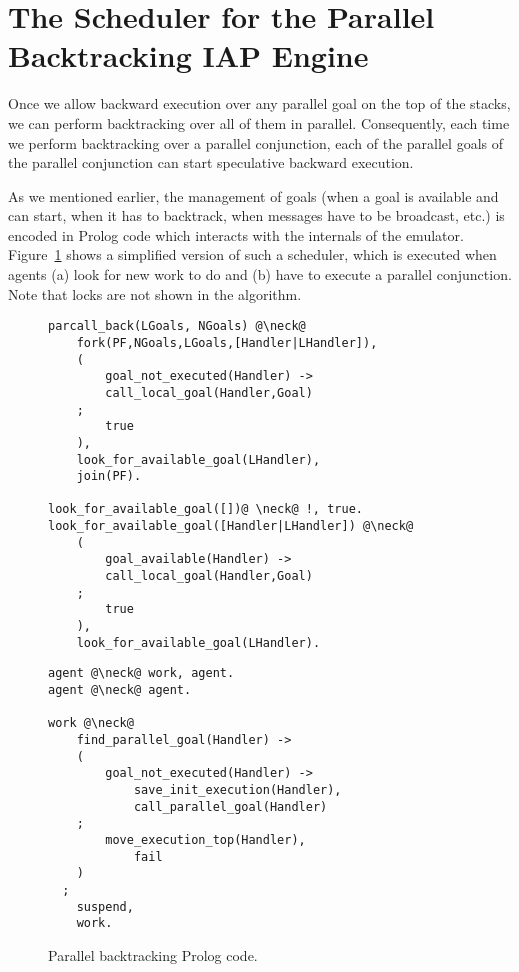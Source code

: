\documentclass{tlp}
\newcounter{mnotei} \setcounter{mnotei}{0}
\newcommand{\mnote}[1]{{\scriptsize\textsf{\textcolor{blue}{}}}\marginpar{\scriptsize\textsf{\textcolor{red}{n.\themnotei: #1}}}\stepcounter{mnotei} }
\renewcommand{\mnote}[1]{}
\newcommand{\compressection}{\vspace{-1em}}
\newcommand{\compressfigure}{\vspace{-1em}}
\begin{document}
\mnote{MCL: we show speedups, but not how often goals are trapped.
  Can we get numbers for that? There would be trapped goals only in
  qsort\_nd for seqback, not for parback. This benchmarks is not
  actually working under seqback.}














\compressection
\section{The Scheduler for the Parallel Backtracking IAP Engine}
\label{sec:prolog-scheduler}
 
Once we allow backward execution over any parallel goal on the top of
the stacks, we can perform backtracking over all of them in
parallel. Consequently, each time we perform backtracking over a
parallel conjunction, each of the parallel goals of the parallel
conjunction can start speculative backward execution.

As we mentioned earlier, the management of goals (when a goal is
available and can start, when it has to backtrack, when messages have
to be broadcast, etc.) is encoded in Prolog code which
interacts with the internals of the emulator.
Figure~\ref{fig:scheduler} shows a simplified version of such a
scheduler, which is executed when agents (a) look for new work to do
and (b) have to execute a parallel conjunction. Note that
locks are not shown in the algorithm.

\begin{figure}[t]
  \centering
  \begin{minipage}[b]{0.49\linewidth}
    \begin{lstlisting}
parcall_back(LGoals, NGoals) @\neck@
    fork(PF,NGoals,LGoals,[Handler|LHandler]),
    (
        goal_not_executed(Handler) ->
        call_local_goal(Handler,Goal)
    ;   
        true
    ),
    look_for_available_goal(LHandler),
    join(PF).

look_for_available_goal([])@ \neck@ !, true.
look_for_available_goal([Handler|LHandler]) @\neck@ 
    (
        goal_available(Handler) ->
        call_local_goal(Handler,Goal)
    ;   
        true
    ),
    look_for_available_goal(LHandler).
    \end{lstlisting}
  \end{minipage}
\hfill
  \begin{minipage}[b]{0.4\linewidth}
    \begin{lstlisting}
agent @\neck@ work, agent.
agent @\neck@ agent.

work @\neck@
    find_parallel_goal(Handler) ->
    ( 
        goal_not_executed(Handler) ->
            save_init_execution(Handler),
            call_parallel_goal(Handler)
	;
	    move_execution_top(Handler),
            fail
    )
  ;
    suspend, 
    work.
    \end{lstlisting}
  \end{minipage}
  \caption{Parallel backtracking Prolog code.} 
  \label{fig:scheduler}
\compressfigure
\end{figure}
\end{document}
